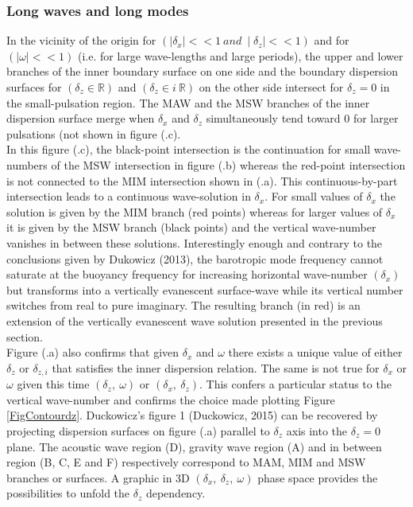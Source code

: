 \documentclass[a4paper,11pt]{article}
\begin{document}
\subsubsection{Long waves and long modes}
In the vicinity of the origin for  $(\mid\delta_x\mid <<1\  and\ \mid\delta_z\mid << 1)$ and for $(\mid\omega\mid <<1)$ (i.e. for large wave-lengths and large periods), the upper and lower branches of the inner boundary surface on one side and the boundary dispersion surfaces for $(\delta_z\in\mathbb{R})$ and $(\delta_z\in i\ \mathbb{R})$ on the other side intersect for $\delta_z=0$ in the small-pulsation region. The MAW and the MSW branches of the inner dispersion surface merge when $\delta_x$ and $\delta_z$ simultaneously tend toward 0 for larger pulsations (not shown in figure (.c).\\
In this figure (.c), the black-point intersection is the continuation for small wave-numbers of the MSW intersection in figure (.b) whereas the red-point intersection is not connected to the MIM intersection shown in (.a). This continuous-by-part intersection leads to a continuous wave-solution in $\delta_x$. For small values of $\delta_x$ the solution is given by the MIM branch (red points) whereas for larger values of $\delta_x$ it is given by the MSW branch (black points) and the vertical wave-number vanishes in between these solutions. Interestingly enough and contrary to the conclusions given by Dukowicz (2013), the barotropic mode frequency cannot saturate at the buoyancy frequency for increasing horizontal wave-number $(\delta_x)$ but transforms into a vertically evanescent surface-wave while its vertical number switches from real to pure imaginary. The resulting branch (in red) is an extension of the vertically evanescent wave solution presented in the previous section.\\
Figure (.a) also confirms that given $\delta_x$ and $\omega$ there exists a unique value of either $\delta_z$ or $\delta_{z,i}$ that satisfies the inner dispersion relation. The same is not true for $\delta_x$ or $\omega$ given this time $(\delta_z,\ \omega)$ or $(\delta_x,\ \delta_z)$. This confers a particular status to the vertical wave-number and confirms the choice made plotting Figure \ref{FigContourdz}. Duckowicz's figure 1 (Duckowicz, 2015) can be recovered by projecting dispersion surfaces on figure (.a) parallel to $\delta_z$ axis into the $\delta_z=0$ plane. The acoustic wave region (D), gravity wave region (A) and in between region (B, C, E and F) respectively correspond to MAM, MIM and MSW branches or surfaces. A graphic in 3D $(\delta_x,\ \delta_z,\ \omega)$ phase space provides the possibilities to unfold the $\delta_z$ dependency. \\
\end{document}
